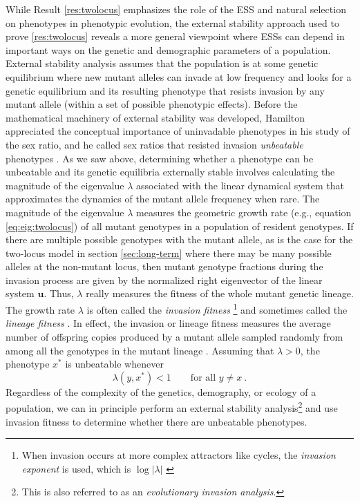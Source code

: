 \documentclass[11pt]{article}
\newcommand{\ess}[1]{#1^*}
\renewcommand{\vec}[1]{\symbf{#1}}
\newcommand{\eig}{\lambda}
\begin{document}
While Result \ref{res:twolocus} emphasizes the role of the ESS and natural selection on phenotypes in phenotypic evolution, the external stability approach used to prove \ref{res:twolocus} reveals a more general viewpoint where ESSs can depend in important ways on the genetic and demographic parameters of a population. External stability analysis assumes that the population is at some genetic equilibrium where new mutant alleles can invade at low frequency and looks for a genetic equilibrium and its resulting phenotype that resists invasion by any mutant allele (within a set of possible phenotypic effects). Before the mathematical machinery of external stability was developed, Hamilton appreciated the conceptual importance of uninvadable phenotypes in his study of the sex ratio, and he called sex ratios that resisted invasion \textit{unbeatable} phenotypes \cite{Hamilton:1967}. As we saw above, determining whether a phenotype can be unbeatable and its genetic equilibria externally stable involves calculating the magnitude of the eigenvalue $\eig$ associated with the linear dynamical system that approximates the dynamics of the mutant allele frequency when rare. The magnitude of the eigenvalue $\eig$ measures the geometric growth rate (e.g., equation \eqref{eq:eig:twolocus}) of all mutant genotypes in a population of resident genotypes. If there are multiple possible genotypes with the mutant allele, as is the case for the two-locus model in section \ref{sec:long-term} where there may be many possible alleles at the non-mutant locus, then mutant genotype fractions during the invasion process are given by the normalized right eigenvector of the linear system $\vec{u}$. Thus, $\eig$ really measures the fitness of the whole mutant genetic lineage. The growth rate $\eig$ is often called the \textit{invasion fitness} \cite{Metz:Nisbet:1992,Heino:Metz:1998}\footnote{When invasion occurs at more complex attractors like cycles, the \textit{invasion exponent} is used, which is $\log |\eig|$ \cite{Rand:Wilson:1994}} and sometimes called the \textit{lineage fitness} \cite{Lehmann:Alger:2015,Akcay:VanCleve:2016,Lehmann:Mullon:2016,Lehmann:Rousset:2020}. In effect, the invasion or lineage fitness measures the average number of offspring copies produced by a mutant allele sampled randomly from among all the genotypes in the mutant lineage \cite{Lehmann:Mullon:2016}. Assuming that $\eig >0$, the phenotype $\ess{x}$ is unbeatable whenever
\begin{equation}
  \label{eq:unbeatable}
  \eig(y, \ess{x}) < 1 \qquad \text{for all } y \ne x \: .
\end{equation}
Regardless of the complexity of the genetics, demography, or ecology of a population, we can in principle perform an external stability analysis\footnote{This is also referred to as an \textit{evolutionary invasion analysis}.} and use invasion fitness to determine whether there are unbeatable phenotypes.
\end{document}
